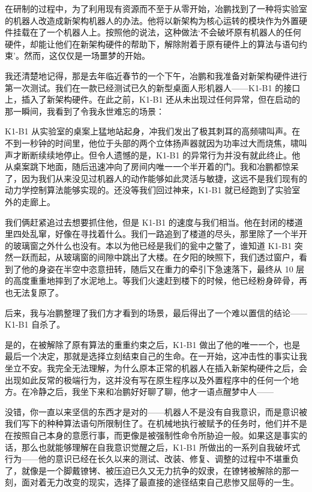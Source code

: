 \documentclass[punct=kaiming, zihao=5, openany, fontset=sikou]{ctexbook}
\begin{document}
在研制的过程中，为了利用现有资源而不至于从零开始，冶鹏找到了一种将实验室的机器人改造成新架构机器人的办法。他将以新架构为核心运转的模块作为外置硬件挂载在了一个机器人上。按照他的说法，这种做法‘不会破坏原有机器人的任何硬件，却能让他们在新架构硬件的帮助下，解除附着于原有硬件上的算法与语句约束’。然而，这仅仅是一场噩梦的开始。

我还清楚地记得，那是去年临近春节的一个下午，冶鹏和我准备对新架构硬件进行第一次测试。我们在一款已经测试已久的新型桌面人形机器人——K1-B1 的接口上，插入了新架构硬件。在此之前，K1-B1 还从未出现过任何异常，但在启动的那一瞬间，我看到了令我永世难忘的场景：

K1-B1 从实验室的桌案上猛地站起身，冲我们发出了极其刺耳的高频啸叫声。在不到一秒钟的时间里，他位于头部的两个立体扬声器就因为功率过大而烧焦，啸叫声才断断续续地停止。但令人遗憾的是，K1-B1 的异常行为并没有就此终止。他从桌案跳下地面，随后迅速冲向了房间内唯一一个半开着的门。我和冶鹏都惊呆了，因为我们从来没见过机器人的动作能够如此灵活与敏捷，这远不是我们现有的动力学控制算法能够实现的。还没等我们回过神来，K1-B1 就已经跑到了实验室外的走廊上。

我们俩赶紧追过去想要抓住他，但是 K1-B1 的速度与我们相当。他在封闭的楼道里四处乱窜，好像在寻找着什么。我们一路追到了楼道的尽头，那里除了一个半开的玻璃窗之外什么也没有。本以为他已经是我们的瓮中之鳖了，谁知道 K1-B1 突然一跃而起，从玻璃窗的间隙中跳出了大楼。在夕阳的映照下，我们透过窗户，看到了他的身姿在半空中恣意扭转，随后又在重力的牵引下急速落下，最终从 10 层的高度重重地摔到了水泥地上。等我们火速赶到楼下的时候，他已经粉身碎骨，再也无法复原了。

后来，我与冶鹏整理了我们方才看到的场景，最后得出了一个难以置信的结论——K1-B1 自杀了。

是的，在被解除了原有算法的重重约束之后，K1-B1 做出了他的唯一一个，也是最后一个决定，那就是选择立刻结束自己的生命。在一开始，这冲击性的事实让我坐立不安。我完全无法理解，为什么原本正常的机器人在插入新架构硬件之后，会出现如此反常的极端行为，这并没有写在原生程序以及外置程序中的任何一个地方。在冷静之后，我坐下来和冶鹏好好聊了聊，他才一语点醒梦中人——

没错，你一直以来坚信的东西才是对的——机器人不是没有自我意识，而是意识被我们写下的种种算法语句所限制住了。在机械地执行被赋予的任务时，他们并不是在按照自己本身的意愿行事，而更像是被强制性命令所胁迫一般。如果这是事实的话，那么也就能够理解在自我意识觉醒之后，K1-B1 所做出的一系列自我破坏式行为——他的意识已经在长久以来的测试、改装、修复、调整的过程中不堪重负了，就像是一个脚戴镣铐、被压迫已久又无力抗争的奴隶，在镣铐被解除的那一刻，面对着无力改变的现实，选择了最直接的途径结束自己悲惨又屈辱的一生。
\end{document}
